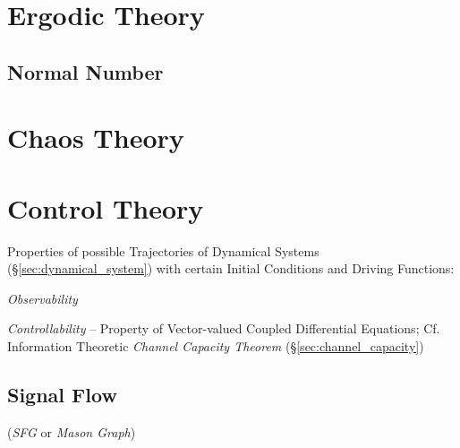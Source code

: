 \section{Ergodic Theory}\label{sec:ergodic_theory}

\subsection{Normal Number}\label{sec:normal_number}



\section{Chaos Theory}\label{sec:chaos_theory}

\section{Control Theory}\label{sec:control_theory}

Properties of possible Trajectories of Dynamical Systems
(\S\ref{sec:dynamical_system}) with certain Initial Conditions and
Driving Functions:

\emph{Observability}

\emph{Controllability} -- Property of Vector-valued Coupled
Differential Equations; \fist Cf. Information Theoretic \emph{Channel
  Capacity Theorem} (\S\ref{sec:channel_capacity})



\subsection{Signal Flow}\label{sec:signal_flow}

(\emph{SFG} or \emph{Mason Graph})

